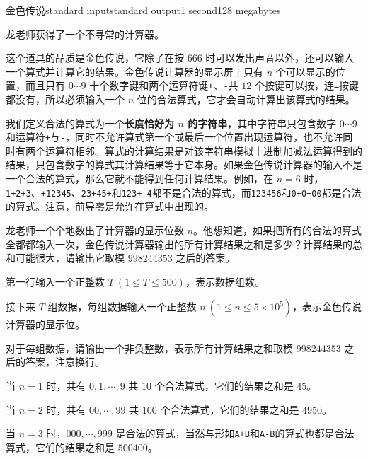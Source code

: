 \begin{problem}{金色传说}{standard input}{standard output}{1 second}{128 megabytes}

    龙老师获得了一个不寻常的计算器。
    
    这个道具的品质是金色传说，它除了在按 $666$ 时可以发出声音以外，还可以输入一个算式并计算它的结果。金色传说计算器的显示屏上只有 $n$ 个可以显示的位置，而且只有 $0\cdots 9$ 十个数字键和两个运算符键\texttt{+}、\texttt{-}共 $12$ 个按键可以按，连\texttt{=}按键都没有，所以必须输入一个 $n$ 位的合法算式，它才会自动计算出该算式的结果。

    我们定义合法的算式为一个\textbf{长度恰好为 $n$ 的字符串}，其中字符串只包含数字 $0\cdots 9$ 和运算符\texttt{+}与\texttt{-}，同时不允许算式第一个或最后一个位置出现运算符，也不允许同时有两个运算符相邻。算式的计算结果是对该字符串模拟十进制加减法运算得到的结果，只包含数字的算式其计算结果等于它本身。如果金色传说计算器的输入不是一个合法的算式，那么它就不能得到任何计算结果。例如，在 $n=6$ 时，\texttt{1+2+3}、\texttt{+12345}、\texttt{23+45+}和\texttt{123+-4}都不是合法的算式，而\texttt{123456}和\texttt{0+0+00}都是合法的算式。注意，前导零是允许在算式中出现的。

    龙老师一个个地数出了计算器的显示位数 $n$。他想知道，如果把所有的合法的算式全都都输入一次，金色传说计算器输出的所有计算结果之和是多少？计算结果的总和可能很大，请输出它取模 $998244353$ 之后的答案。

    \InputFile
    
    第一行输入一个正整数 $T\ (1\le T\le 500)$，表示数据组数。

    接下来 $T$ 组数据，每组数据输入一个正整数 $n\ (1\le n\le 5\times 10^5)$，表示金色传说计算器的显示位。
    
    \OutputFile
    
    对于每组数据，请输出一个非负整数，表示所有计算结果之和取模 $998244353$ 之后的答案，注意换行。
    
    \Example
    
    \begin{example}
    \end{example}

    \Explanation

    当 $n=1$ 时，共有 $0,1,\cdots ,9$ 共 $10$ 个合法算式，它们的结果之和是 $45$。

    当 $n=2$ 时，共有 $00,\cdots ,99$ 共 $100$ 个合法算式，它们的结果之和是 $4950$。

    当 $n=3$ 时，$000,\cdots ,999$ 是合法的算式，当然与形如\texttt{A+B}和\texttt{A-B}的算式也都是合法算式，它们的结果之和是 $500400$。

\end{problem}